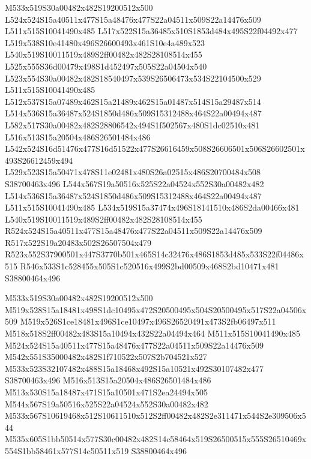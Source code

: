\documentclass{article}
\begin{document}
\begin{multicols}{2}
M533x519S30a00482x482S19200512x500 L524x524S15a40511x477S15a48476x477S22a04511x509S22a14476x509 L511x515S10041490x485 L517x522S15a36485x510S1853d484x495S22f04492x477 L519x538S10e41480x496S26600493x461S10e4a489x523 L540x519S10011519x489S2ff00482x482S28108514x455 L525x555S36d00479x498S1d452497x505S22a04504x540 L523x554S30a00482x482S18540497x539S26506473x534S22104500x529 L511x515S10041490x485 L512x537S15a07489x462S15a21489x462S15a01487x514S15a29487x514 L514x536S15a36487x524S1850d486x509S15312488x464S22a00494x487 L582x517S30a00482x482S28806542x494S1f502567x480S1dc02510x481 L516x513S15a20504x486S26501484x486 L542x524S16d51476x477S16d51522x477S26616459x508S26606501x506S26602501x493S26612459x494 L529x523S15a50471x478S11e02481x480S26a02515x486S20700484x508 S38700463x496 L544x567S19a50516x525S22a04524x552S30a00482x482 L514x536S15a36487x524S1850d486x509S15312488x464S22a00494x487 L511x515S10041490x485 L534x519S15a37474x496S18141510x486S2da00466x481 L540x519S10011519x489S2ff00482x482S28108514x455 R524x524S15a40511x477S15a48476x477S22a04511x509S22a14476x509 R517x522S19a20483x502S26507504x479 R523x552S37900501x447S3770b501x465S14c32476x486S1853d485x533S22f04486x515 R546x533S1c528455x505S1c520516x499S2bd00509x468S2bd10471x481 S38800464x496

M533x519S30a00482x482S19200512x500 M519x528S15a18481x498S1dc10495x472S20500495x504S20500495x517S22a04506x509 M519x526S1ce18481x496S1ce10497x496S26520491x473S2fb06497x511 M518x518S2ff00482x483S15a10494x432S22a04494x464 M511x515S10041490x485 M524x524S15a40511x477S15a48476x477S22a04511x509S22a14476x509 M542x551S35000482x482S1f710522x507S2b704521x527 M533x523S32107482x488S15a18468x492S15a10521x492S30107482x477 S38700463x496 M516x513S15a20504x486S26501484x486 M513x530S15a18487x471S15a10501x471S2ea24494x505 M544x567S19a50516x525S22a04524x552S30a00482x482 M533x567S10619468x512S10611510x512S2ff00482x482S2e311471x544S2e309506x544 M535x605S1bb50514x577S30c00482x482S14c58464x519S26500515x555S26510469x554S1bb58461x577S14c50511x519 S38800464x496


\end{multicols}
\end{document}
